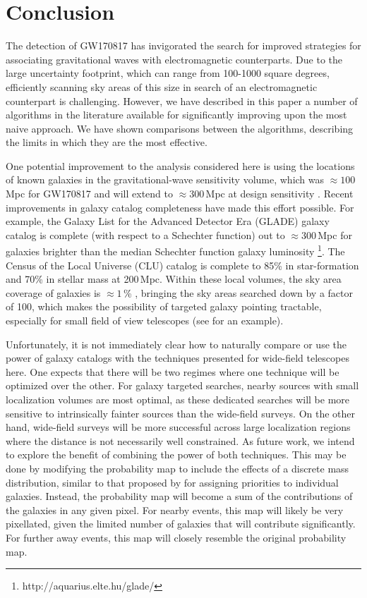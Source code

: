 \documentclass[twocolumn]{aastex62}
\begin{document}
\section{Conclusion}
\label{sec:conclusions}

The detection of GW170817 \citep{AbEA2017b} has invigorated the search for improved strategies for associating gravitational waves with electromagnetic
counterparts.
Due to the large uncertainty footprint, which can range from 100-1000 square degrees, efficiently scanning sky areas  of this size in search of an electromagnetic counterpart is challenging.
However, we have described in this paper a number of algorithms in the literature available for significantly improving upon the most naive approach.
We have shown comparisons between the algorithms, describing the limits in which they are the most effective.

One potential improvement to the analysis considered here is using the locations of known galaxies in the gravitational-wave sensitivity volume, which was $\approx 100$\,Mpc for GW170817 \citep{AbEA2017b} and will extend to $\approx 300$\,Mpc at design sensitivity \citep{AbEA2016h}. 
Recent improvements in galaxy catalog completeness have made this effort possible. For example, the Galaxy List for the Advanced Detector Era (GLADE) galaxy catalog is complete (with respect to a Schechter function) out to $\approx 300$\,Mpc for galaxies brighter than the median Schechter function galaxy luminosity \footnote{http://aquarius.elte.hu/glade/}. The Census of the Local Universe (CLU) catalog \citep{CoKa2017} is complete to 85\% in star-formation and 70\% in stellar mass at 200\,Mpc.
Within these local volumes, the sky area coverage of galaxies is $\approx 1$\,\% \cite{CoKa2017}, bringing the sky areas searched down by a factor of 100, which makes the possibility of targeted galaxy pointing tractable, especially for small field of view telescopes (see \cite{ArMc2017} for an example). 

Unfortunately, it is not immediately clear how to naturally compare or use the power of galaxy catalogs with the techniques presented for wide-field telescopes here. 
One expects that there will be two regimes where one technique will be optimized over the other.
For galaxy targeted searches, nearby sources with small localization volumes are most optimal, as these dedicated searches will be more sensitive to intrinsically fainter sources than the wide-field surveys.
On the other hand, wide-field surveys will be more successful across large localization regions where the distance is not necessarily well constrained.
As future work, we intend to explore the benefit of combining the power of both techniques. This may be done by modifying the probability map to include the effects of a discrete mass distribution, similar to that proposed by \cite{ArMc2017} for assigning priorities to individual galaxies. Instead, the probability map will become a sum of the contributions of the galaxies in any given pixel. For nearby events, this map will likely be very pixellated, given the limited number of galaxies that will contribute significantly. For further away events, this map will closely resemble the original probability map.
\end{document}
